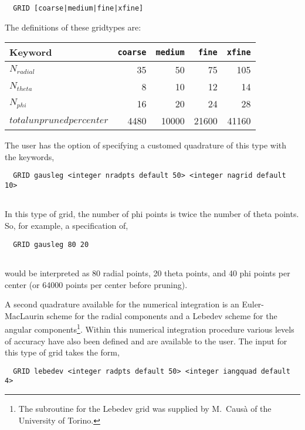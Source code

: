 \begin{verbatim}
  GRID [coarse|medium|fine|xfine]

\end{verbatim}

The definitions of these gridtypes are:\\


  \begin{tabular}[right]{|l|r r r r|} \hline
Keyword & {\tt coarse} & {\tt medium} & {\tt fine} & {\tt xfine} \\ \hline
$N_{radial}$ & 35 & 50 & 75 & 105 \\
$N_{theta}$ & 8 & 10 & 12 & 14 \\  \hline
$N_{phi}$ & 16 & 20 & 24 & 28 \\  \hline
$total unpruned per center$ & 4480 & 10000 & 21600 & 41160 \\  \hline
  \end{tabular}

The user has the option of specifying a customed quadrature of this
type with the keywords,

\begin{verbatim}
  GRID gausleg <integer nradpts default 50> <integer nagrid default 10> 
        
\end{verbatim}

In this type of grid, the number of phi points is twice the number of
theta points. So, for example, a specification of,

\begin{verbatim}
  GRID gausleg 80 20
        
\end{verbatim}

would be interpreted as 80 radial points, 20 theta points, and 40
phi points per center (or 64000 points per center before pruning).

A second quadrature available for the numerical integration is an
Euler-MacLaurin scheme for the radial components and a Lebedev
scheme for the angular components\footnote{The subroutine 
for the Lebedev grid was supplied by M.~Caus\`a of the University of
Torino.}.  Within this numerical integration procedure various levels 
of accuracy have also been defined and are available to the user.  
The input for this type of grid takes the form,

\begin{verbatim}
  GRID lebedev <integer radpts default 50> <integer iangquad default 4> 

\end{verbatim}

